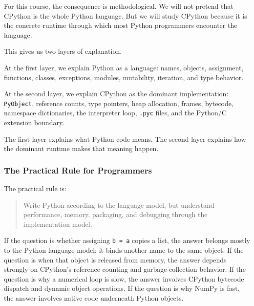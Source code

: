 For this course, the consequence is methodological. We will not pretend that CPython is the whole Python language. But we will study CPython because it is the concrete runtime through which most Python programmers encounter the language.

This gives us two layers of explanation.

At the first layer, we explain Python as a language: names, objects, assignment, functions, classes, exceptions, modules, mutability, iteration, and type behavior.

At the second layer, we explain CPython as the dominant implementation: \texttt{PyObject}, reference counts, type pointers, heap allocation, frames, bytecode, namespace dictionaries, the interpreter loop, \texttt{.pyc} files, and the Python/C extension boundary.

The first layer explains what Python code means. The second layer explains how the dominant runtime makes that meaning happen.

\subsubsection{The Practical Rule for Programmers}

The practical rule is:

\begin{quote}
Write Python according to the language model, but understand performance, memory, packaging, and debugging through the implementation model.
\end{quote}

If the question is whether assigning \texttt{b = a} copies a list, the answer belongs mostly to the Python language model: it binds another name to the same object. If the question is when that object is released from memory, the answer depends strongly on CPython's reference counting and garbage-collection behavior. If the question is why a numerical loop is slow, the answer involves CPython bytecode dispatch and dynamic object operations. If the question is why NumPy is fast, the answer involves native code underneath Python objects.


